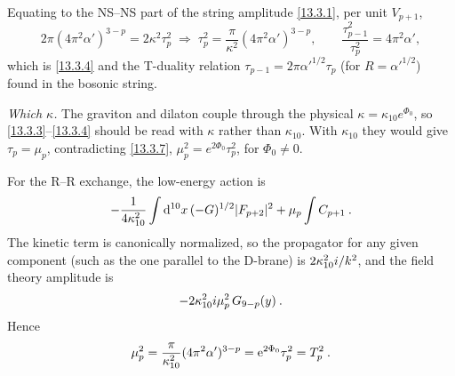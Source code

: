 \begin{tcolorbox}[breakable]
\begin{remark}
		Equating to the NS--NS part of the string amplitude \eqref{13.3.1}, per unit $V_{p+1}$,
		\begin{equation*}
			2\pi(4\pi^2\alpha')^{3-p} = 2\kappa^2\tau_p^2 \;\Longrightarrow\; \tau_p^2=\frac{\pi}{\kappa^2}(4\pi^2\alpha')^{3-p},
			\qquad \frac{\tau_{p-1}^2}{\tau_p^2}=4\pi^2\alpha' ,
		\end{equation*}
		which is \eqref{13.3.4} and the T-duality relation $\tau_{p-1}=2\pi\alpha'^{1/2}\tau_p$ (for $R=\alpha'^{1/2}$) found in the bosonic string.

		\textit{Which $\kappa$.} The graviton and dilaton couple through the physical $\kappa=\kappa_{10}e^{\Phi_0}$, so \eqref{13.3.3}--\eqref{13.3.4} should be read with $\kappa$ rather than $\kappa_{10}$. With $\kappa_{10}$ they would give $\tau_p=\mu_p$, contradicting \eqref{13.3.7}, $\mu_p^2=e^{2\Phi_0}\tau_p^2$, for $\Phi_0\neq0$.
	\end{remark}
\end{tcolorbox}
\noindent For the R--R exchange, the low-energy action is
\begin{equation}
	-\frac{1}{4\kappa_{10}^2}\int \mathrm{d}^{10}x\,(-G)^{1/2}|F_{p+2}|^2 + \mu_p \int C_{p+1} \:. \label{13.3.5}
\end{equation}
The kinetic term is canonically normalized, so the propagator for any given component (such as the one parallel to the D-brane) is $2\kappa_{10}^2i/k^2$, and the field theory amplitude is
\begin{equation}
	-2\kappa_{10}^2i\mu_p^2\,G_{9-p}(y) \:. \label{13.3.6}
\end{equation}
Hence
\begin{equation}
	\mu_p^2 = \frac{\pi}{\kappa_{10}^2}(4\pi^2\alpha')^{3-p} = \mathrm{e}^{2\Phi_0}\tau_p^2 = T_p^2 \:. \label{13.3.7}
\end{equation}
